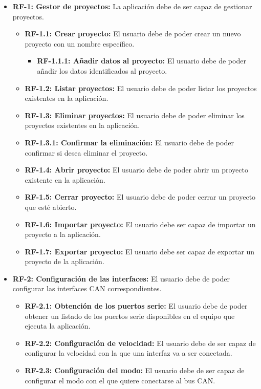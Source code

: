 \begin{itemize}
\item
\textbf{RF-1: Gestor de proyectos:} La aplicación debe de ser capaz de gestionar proyectos.
\begin{itemize}
\item
\textbf{RF-1.1: Crear proyecto:} El usuario debe de poder crear un nuevo proyecto con un nombre específico.
\begin{itemize}
\item
\textbf{RF-1.1.1: Añadir datos al proyecto:} El usuario debe de poder añadir los datos identificados al proyecto.
\end{itemize}
\item
\textbf{RF-1.2: Listar proyectos:} El usuario debe de poder listar los proyectos existentes en la aplicación.
\item
\textbf{RF-1.3: Eliminar proyectos:} El usuario debe de poder eliminar los proyectos existentes en la aplicación.
\item
\textbf{RF-1.3.1: Confirmar la eliminación:} El usuario debe de poder confirmar si desea eliminar el proyecto.
\item
\textbf{RF-1.4: Abrir proyecto:} El usuario debe de poder abrir un proyecto existente en la aplicación.
\item
\textbf{RF-1.5: Cerrar proyecto:} El usuario debe de poder cerrar un proyecto que esté abierto.
\item
\textbf{RF-1.6: Importar proyecto:} El usuario debe ser capaz de importar un proyecto a la aplicación.
\item
\textbf{RF-1.7: Exportar proyecto:} El usuario debe ser capaz de exportar un proyecto de la aplicación.
\end{itemize}
\item
\textbf{RF-2: Configuración de las interfaces:} El usuario debe de poder configurar las interfaces CAN correspondientes.
\begin{itemize}
\item
\textbf{RF-2.1: Obtención de los puertos serie:} El usuario debe de poder obtener un listado de los puertos serie disponibles en el equipo que ejecuta la aplicación.
\item
\textbf{RF-2.2: Configuración de velocidad:} El usuario debe de ser capaz de configurar la velocidad con la que una interfaz va a ser conectada.
\item
\textbf{RF-2.3: Configuración del modo:} El usuario debe de ser capaz de configurar el modo con el que quiere conectarse al bus CAN.
\end{itemize}

\end{itemize}

